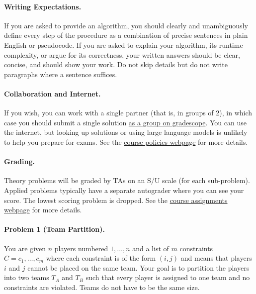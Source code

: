 \documentclass[11pt]{article}
\begin{document}
\paragraph{Writing Expectations.} If you are asked to provide an algorithm, you should clearly and unambiguously define every step of the procedure as a combination of precise sentences in plain English or pseudocode. If you are asked to explain your algorithm, its runtime complexity, or argue for its correctness, your written answers should be clear, concise, and should show your work. Do not skip details but do not write paragraphs where a sentence suffices.

\paragraph{Collaboration and Internet.} If you wish, you can work with a single partner (that is, in groups of 2), in which case you should submit a single solution \href{https://help.gradescope.com/article/m5qz2xsnjy-student-add-group-members}{as a group on gradescope}. You can use the internet, but looking up solutions or using large language models is unlikely to help you prepare for exams. See the \href{https://sites.duke.edu/spring24compsci330/policies/}{course policies webpage} for more details.

\paragraph{Grading.} Theory problems will be graded by TAs on an S/U scale (for each sub-problem). Applied problems typically have a separate autograder where you can see your score. The lowest scoring problem is dropped. See the \href{https://sites.duke.edu/spring24compsci330/assignments/}{course assignments webpage} for more details.





\newpage
\paragraph{Problem 1 (Team Partition).} You are given $n$ players numbered $1, \dots, n$
and a list of $m$ constraints $C = c_1, \dots, c_m$ where each constraint is of the form $(i, j)$ and means that players $i$ and $j$ cannot be placed on the same team. Your goal is to partition the players into two teams $T_A$ and $T_B$ such that every player is assigned to one team and no constraints are violated. Teams do not have to be the same size.
\end{document}
